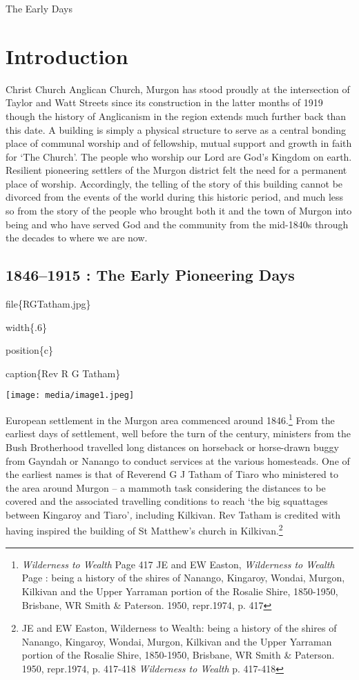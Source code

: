 The Early Days

\hypertarget{introduction}{%
\chapter{Introduction}\label{introduction}}

Christ Church Anglican Church, Murgon has stood proudly at the intersection of Taylor and Watt Streets since its construction in the latter months of 1919 though the history of Anglicanism in the region extends much further back than this date. A building is simply a physical structure to serve as a central bonding place of communal worship and of fellowship, mutual support and growth in faith for `The Church'. The people who worship our Lord are God's Kingdom on earth. Resilient pioneering settlers of the Murgon district felt the need for a permanent place of worship. Accordingly, the telling of the story of this building cannot be divorced from the events of the world during this historic period, and much less so from the story of the people who brought both it and the town of Murgon into being and who have served God and the community from the mid-1840s through the decades to where we are now.

\hypertarget{the-early-pioneering-days}{%
\section{1846--1915 : The Early Pioneering Days}\label{the-early-pioneering-days}}

file\{RGTatham.jpg\}

width\{.6\}

position\{c\}

caption\{Rev R G Tatham\}

\texttt{[image: media/image1.jpeg]}

European settlement in the Murgon area commenced around 1846.\footnote{\emph{Wilderness to Wealth} Page 417 JE and EW Easton, \emph{Wilderness to Wealth} Page : being a history of the shires of Nanango, Kingaroy, Wondai, Murgon, Kilkivan and the Upper Yarraman portion of the Rosalie Shire, 1850-1950, Brisbane, WR Smith \& Paterson. 1950, repr.1974, p. 417} From the earliest days of settlement, well before the turn of the century, ministers from the Bush Brotherhood travelled long distances on horseback or horse-drawn buggy from Gayndah or Nanango to conduct services at the various homesteads. One of the earliest names is that of Reverend G J Tatham of Tiaro who ministered to the area around Murgon -- a mammoth task considering the distances to be covered and the associated travelling conditions to reach `the big squattages between Kingaroy and Tiaro'\emph{,} including Kilkivan. Rev Tatham is credited with having inspired the building of St Matthew's church in Kilkivan.\footnote{JE and EW Easton, Wilderness to Wealth: being a history of the shires of Nanango, Kingaroy, Wondai, Murgon, Kilkivan and the Upper Yarraman portion of the Rosalie Shire, 1850-1950, Brisbane, WR Smith \& Paterson. 1950, repr.1974, p. 417-418 \emph{Wilderness to Wealth} p. 417-418}

